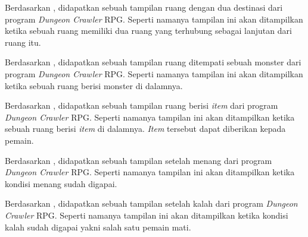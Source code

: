 \documentclass[../main.tex]{subfiles}
\begin{document}
\begin{indentpar}
    \hspace{\parindent}Berdasarkan , didapatkan sebuah tampilan ruang dengan dua destinasi dari program \textit{Dungeon Crawler} RPG. Seperti namanya tampilan ini akan ditampilkan ketika sebuah ruang memiliki dua ruang yang terhubung sebagai lanjutan dari ruang itu.
\end{indentpar}

\blanktop
{}
\begin{indentpar}
    \hspace{\parindent}Berdasarkan , didapatkan sebuah tampilan ruang ditempati sebuah monster dari program \textit{Dungeon Crawler} RPG. Seperti namanya tampilan ini akan ditampilkan ketika sebuah ruang berisi monster di dalamnya.
\end{indentpar}

\begin{indentpar}
    \hspace{\parindent}Berdasarkan , didapatkan sebuah tampilan ruang berisi \textit{item} dari program \textit{Dungeon Crawler} RPG. Seperti namanya tampilan ini akan ditampilkan ketika sebuah ruang berisi \textit{item} di dalamnya. \textit{Item} tersebut dapat diberikan kepada pemain.
\end{indentpar}

\begin{indentpar}
    \hspace{\parindent}Berdasarkan , didapatkan sebuah tampilan setelah menang dari program \textit{Dungeon Crawler} RPG. Seperti namanya tampilan ini akan ditampilkan ketika kondisi menang sudah digapai.
\end{indentpar}

\begin{indentpar}
    \hspace{\parindent}Berdasarkan , didapatkan sebuah tampilan setelah kalah dari program \textit{Dungeon Crawler} RPG. Seperti namanya tampilan ini akan ditampilkan ketika kondisi kalah sudah digapai yakni salah satu pemain mati.
\end{indentpar}
\end{document}
